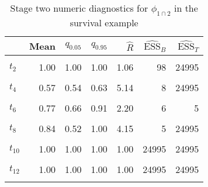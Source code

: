 \begin{table}

\caption{\label{tab:surv-stage-two-diag-phi-12}Stage two numeric diagnostics for $\phi_{1 \cap 2}$ in the survival example}
\centering
\begin{tabular}[t]{lrrrrrr}
\toprule
  & Mean & $q_{0.05}$ & $q_{0.95}$ & $\widehat{R}$ & $\widehat{\text{ESS}}_{B}$ & $\widehat{\text{ESS}}_{T}$\\
\midrule
\cellcolor{gray!6}{$t_{1}$} & \cellcolor{gray!6}{1.00} & \cellcolor{gray!6}{1.00} & \cellcolor{gray!6}{1.00} & \cellcolor{gray!6}{1.07} & \cellcolor{gray!6}{45} & \cellcolor{gray!6}{24995}\\
$t_{2}$ & 1.00 & 1.00 & 1.00 & 1.06 & 98 & 24995\\
\cellcolor{gray!6}{$t_{3}$} & \cellcolor{gray!6}{0.92} & \cellcolor{gray!6}{0.76} & \cellcolor{gray!6}{1.00} & \cellcolor{gray!6}{2.17} & \cellcolor{gray!6}{7} & \cellcolor{gray!6}{24995}\\
$t_{4}$ & 0.57 & 0.54 & 0.63 & 5.14 & 8 & 24995\\
\cellcolor{gray!6}{$t_{5}$} & \cellcolor{gray!6}{1.00} & \cellcolor{gray!6}{1.00} & \cellcolor{gray!6}{1.00} & \cellcolor{gray!6}{1.00} & \cellcolor{gray!6}{24995} & \cellcolor{gray!6}{24995}\\
$t_{6}$ & 0.77 & 0.66 & 0.91 & 2.20 & 6 & 5\\
\cellcolor{gray!6}{$t_{7}$} & \cellcolor{gray!6}{1.00} & \cellcolor{gray!6}{1.00} & \cellcolor{gray!6}{1.00} & \cellcolor{gray!6}{1.00} & \cellcolor{gray!6}{24995} & \cellcolor{gray!6}{24995}\\
$t_{8}$ & 0.84 & 0.52 & 1.00 & 4.15 & 5 & 24995\\
\cellcolor{gray!6}{$t_{9}$} & \cellcolor{gray!6}{1.00} & \cellcolor{gray!6}{1.00} & \cellcolor{gray!6}{1.00} & \cellcolor{gray!6}{1.00} & \cellcolor{gray!6}{24995} & \cellcolor{gray!6}{24995}\\
$t_{10}$ & 1.00 & 1.00 & 1.00 & 1.00 & 24995 & 24995\\
\cellcolor{gray!6}{$t_{11}$} & \cellcolor{gray!6}{0.64} & \cellcolor{gray!6}{0.42} & \cellcolor{gray!6}{0.84} & \cellcolor{gray!6}{2.58} & \cellcolor{gray!6}{8} & \cellcolor{gray!6}{6}\\
$t_{12}$ & 1.00 & 1.00 & 1.00 & 1.00 & 24995 & 24995\\
\cellcolor{gray!6}{$t_{13}$} & \cellcolor{gray!6}{1.00} & \cellcolor{gray!6}{1.00} & \cellcolor{gray!6}{1.00} & \cellcolor{gray!6}{1.00} & \cellcolor{gray!6}{24995} & \cellcolor{gray!6}{24995}\\

\end{tabular}
\end{table}
